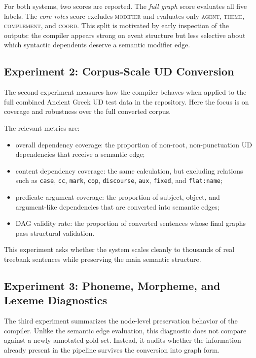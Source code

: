 \documentclass[11pt]{article}
\begin{document}
For both systems, two scores are reported. The \emph{full graph} score evaluates
all five labels. The \emph{core roles} score excludes \textsc{modifier} and
evaluates only \textsc{agent}, \textsc{theme}, \textsc{complement}, and
\textsc{coord}. This split is motivated by early inspection of the outputs: the
compiler appears strong on event structure but less selective about which
syntactic dependents deserve a semantic modifier edge.

\subsection{Experiment 2: Corpus-Scale UD Conversion}
The second experiment measures how the compiler behaves when applied to the full
combined Ancient Greek UD test data in the repository. Here the focus is on
coverage and robustness over the full converted corpus.

The relevant metrics are:
\begin{itemize}
  \item overall dependency coverage: the proportion of non-root,
  non-punctuation UD dependencies that receive a semantic edge;
  \item content dependency coverage: the same calculation, but excluding
  relations such as \texttt{case}, \texttt{cc}, \texttt{mark}, \texttt{cop},
  \texttt{discourse}, \texttt{aux}, \texttt{fixed}, and \texttt{flat:name};
  \item predicate-argument coverage: the proportion of subject, object, and
  argument-like dependencies that are converted into semantic edges;
  \item DAG validity rate: the proportion of converted sentences whose final
  graphs pass structural validation.
\end{itemize}

This experiment asks whether the system scales cleanly to thousands of real
treebank sentences while preserving the main semantic structure.

\subsection{Experiment 3: Phoneme, Morpheme, and Lexeme Diagnostics}
The third experiment summarizes the node-level preservation behavior of the
compiler. Unlike the semantic edge evaluation, this diagnostic does not compare
against a newly annotated gold set. Instead, it audits whether the information
already present in the pipeline survives the conversion into graph form.
\end{document}

